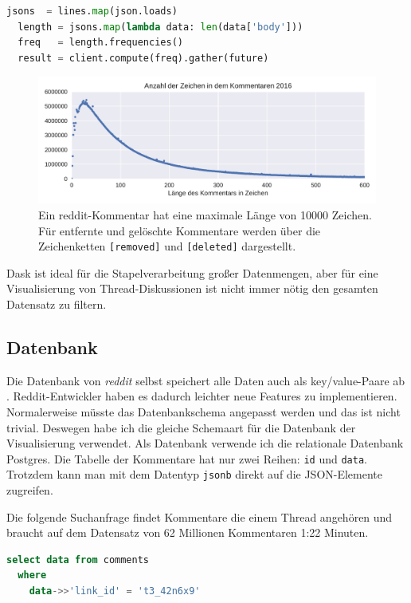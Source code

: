\documentclass[nobib, nohyper, a4paper,openany]{tufte-book}
\newcommand{\jc}[1]{\texttt{#1}}
\begin{document}
\begin{lstlisting}[language=python]
  jsons  = lines.map(json.loads)
  length = jsons.map(lambda data: len(data['body']))
  freq   = length.frequencies()
  result = client.compute(freq).gather(future)
\end{lstlisting}

\begin{figure}
\caption{  Ein reddit-Kommentar hat eine maximale Länge von 10000 Zeichen.
Für entfernte und gelöschte Kommentare werden über die Zeichenketten \jc{[removed]}
und \jc{[deleted]} dargestellt.
}  
  \includegraphics[width=\textwidth]{figures/comment_length_frequencies2016.pdf}  
\end{figure}

Dask ist ideal für die Stapelverarbeitung großer Datenmengen, aber für eine Visualisierung von Thread-Diskussionen ist nicht immer nötig den gesamten Datensatz zu filtern.

\subsection{Datenbank}
Die Datenbank von \emph{reddit} selbst speichert alle Daten auch als {key/value}-Paare ab \cite{EdbergScalingRedditMillion2013}. 
Reddit-Entwickler haben es dadurch leichter neue Features zu implementieren.
Normalerweise müsste das Datenbankschema angepasst werden und das ist nicht trivial.
Deswegen habe ich die gleiche Schemaart für die Datenbank der Visualisierung verwendet. 
Als Datenbank verwende ich die relationale Datenbank Postgres.
Die Tabelle der Kommentare hat nur zwei Reihen: \texttt{id} und \texttt{data}.
Trotzdem kann man mit dem Datentyp \texttt{jsonb} direkt auf die JSON-Elemente zugreifen.

Die folgende Suchanfrage findet Kommentare die einem Thread angehören und 
braucht auf dem Datensatz von 62 Millionen Kommentaren 1:22 Minuten. 

\begin{lstlisting}[language=sql,firstnumber=1]
  select data from comments 
  where 
    data->>'link_id' = 't3_42n6x9' 
\end{lstlisting}
\end{document}
